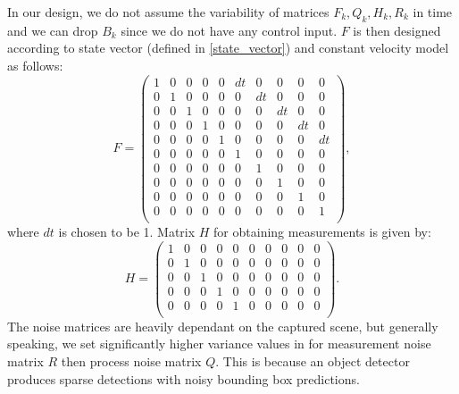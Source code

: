         In our design, we do not assume the variability of matrices $F_k, Q_k, H_k, R_k$ in time and we can drop $B_k$ since we do not have any control input. $F$ is then designed according to state vector (defined in \ref{state_vector}) and constant velocity model as follows:
        \begin{equation}
            F = 
            \begin{pmatrix}
                1 & 0 & 0 & 0 & 0 & dt & 0 & 0 & 0 & 0 \\
                0 & 1 & 0 & 0 & 0 & 0 & dt & 0 & 0 & 0 \\
                0 & 0 & 1 & 0 & 0 & 0 & 0 & dt & 0 & 0 \\
                0 & 0 & 0 & 1 & 0 & 0 & 0 & 0 & dt & 0 \\
                0 & 0 & 0 & 0 & 1 & 0 & 0 & 0 & 0 & dt \\
                0 & 0 & 0 & 0 & 0 & 1 & 0 & 0 & 0 & 0 \\
                0 & 0 & 0 & 0 & 0 & 0 & 1 & 0 & 0 & 0 \\
                0 & 0 & 0 & 0 & 0 & 0 & 0 & 1 & 0 & 0 \\
                0 & 0 & 0 & 0 & 0 & 0 & 0 & 0 & 1 & 0 \\
                0 & 0 & 0 & 0 & 0 & 0 & 0 & 0 & 0 & 1 \\
            \end{pmatrix},
        \end{equation}
        where $dt$ is chosen to be 1. Matrix $H$ for obtaining measurements is given by:
       \begin{equation}
            H = 
            \begin{pmatrix}
                1 & 0 & 0 & 0 & 0 & 0 & 0 & 0 & 0 & 0 \\
                0 & 1 & 0 & 0 & 0 & 0 & 0 & 0 & 0 & 0 \\
                0 & 0 & 1 & 0 & 0 & 0 & 0 & 0 & 0 & 0 \\
                0 & 0 & 0 & 1 & 0 & 0 & 0 & 0 & 0 & 0 \\
                0 & 0 & 0 & 0 & 1 & 0 & 0 & 0 & 0 & 0 \\
            \end{pmatrix}.
        \end{equation}
        The noise matrices are heavily dependant on the captured scene, but generally speaking, we set significantly higher variance values in for measurement noise matrix $R$ then process noise matrix $Q$. This is because an object detector produces sparse detections with noisy bounding box predictions.

